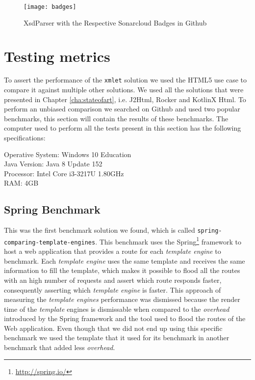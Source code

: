 \begin{figure}[h]
	\centering
	\texttt{[image: badges]}
	\caption{XsdParser with the Respective Sonarcloud Badges in Github}
	\label{project_badges}
\end{figure}

\section{Testing metrics} %
\label{sec:testingmetrics}

To assert the performance of the \texttt{xmlet} solution we used the \ac{HTML}5 use case to compare it against multiple other solutions. We used all the solutions that were presented in Chapter \ref{cha:stateofart}, i.e. J2Html, Rocker and KotlinX Html. To perform an unbiased comparison we searched on Github and used two popular benchmarks, this section will contain the results of these benchmarks. The computer used to perform all the tests present in this section has the following specifications:

Operative System: Windows 10 Education\\
Java Version: Java 8 Update 152\\
Processor: Intel Core i3-3217U 1.80GHz\\
RAM: 4GB

\subsection{Spring Benchmark}
\label{sec:springbenchmark}

This was the first benchmark solution we found, which is called \texttt{spring-comparing-template-engines}\cite{springbenchmark}. This benchmark uses the Spring\footnote{\url{http://spring.io/}} framework to host a web application that provides a route for each \textit{template engine} to benchmark. Each \textit{template engine} uses the same template and receives the same information to fill the template, which makes it possible to flood all the routes with an high number of requests and assert which route responds faster, consequently asserting which \textit{template engine} is faster. This approach of measuring the \textit{template engines} performance was dismissed because the render time of the \textit{template} engines is dismissable when compared to the \textit{overhead} introduced by the Spring framework and the tool used to flood the routes of the Web application. Even though that we did not end up using this specific benchmark we used the template that it used for its benchmark in another benchmark that added less \textit{overhead}.

